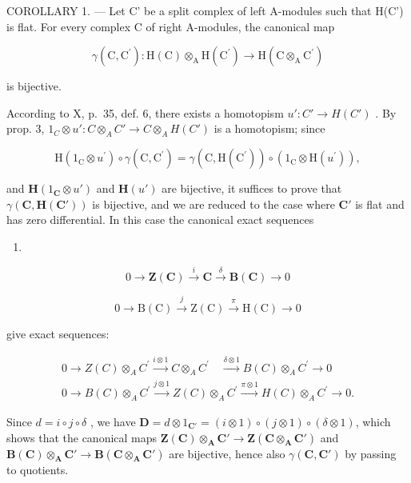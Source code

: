 COROLLARY 1. --- Let C' be a split complex of left A-modules such that H(C') is flat. For every complex C of right A-modules, the canonical map

\[
\gamma (\mathrm{C}, \mathrm{C} ^ {\prime}): \mathrm{H} (\mathrm{C}) \otimes_ {\mathrm{A}} \mathrm{H} (\mathrm{C} ^ {\prime}) \rightarrow \mathrm{H} (\mathrm{C} \otimes_ {\mathrm{A}} \mathrm{C} ^ {\prime})
\]

is bijective.

According to X, p.~35, def. 6, there exists a homotopism \(u': C' \to H(C')\) . By prop. 3, \(1_{C} \otimes u': C \otimes_{A} C' \to C \otimes_{A} H(C')\) is a homotopism; since

\[
\mathrm{H} \left(1 _ {\mathrm{C}} \otimes u ^ {\prime}\right) \circ \gamma (\mathrm{C}, \mathrm{C} ^ {\prime}) = \gamma (\mathrm{C}, \mathrm{H} (\mathrm{C} ^ {\prime})) \circ \left(1 _ {\mathrm{C}} \otimes \mathrm{H} (u ^ {\prime})\right),
\]

and \(\mathbf{H}(1_{\mathbf{C}} \otimes u')\) and \(\mathbf{H}(u')\) are bijective, it suffices to prove that \(\gamma(\mathbf{C}, \mathbf{H}(\mathbf{C}'))\) is bijective, and we are reduced to the case where \(\mathbf{C}'\) is flat and has zero differential. In this case the canonical exact sequences

\begin{enumerate}
\def\labelenumi{(\Roman{enumi})}
\tightlist
\item
\end{enumerate}

\[
0 \to \mathbf {Z} (\mathbf {C}) \xrightarrow {i} \mathbf {C} \xrightarrow {\delta} \mathbf {B} (\mathbf {C}) \to 0\tag{II}
\]

\[
0 \rightarrow \mathrm{B} (\mathrm{C}) \xrightarrow {j} \mathrm{Z} (\mathrm{C}) \xrightarrow {\pi} \mathrm{H} (\mathrm{C}) \rightarrow 0
\]

give exact sequences:

\[
\begin{array}{l} 0 \longrightarrow Z (C) \otimes_ {A} C ^ {\prime} \xrightarrow {i \otimes 1} C \otimes_ {A} C ^ {\prime} \quad \xrightarrow {\delta \otimes 1} B (C) \otimes_ {A} C ^ {\prime} \longrightarrow 0 \\ 0 \longrightarrow B (C) \otimes_ {A} C ^ {\prime} \xrightarrow {j \otimes 1} Z (C) \otimes_ {A} C ^ {\prime} \xrightarrow {\pi \otimes 1} H (C) \otimes_ {A} C ^ {\prime} \longrightarrow 0. \end{array}
\]

Since \(d = i \circ j \circ \delta\) , we have \(\mathbf{D} = d \otimes 1_{\mathbf{C}'} = (i \otimes 1) \circ (j \otimes 1) \circ (\delta \otimes 1)\), which shows that the canonical maps \(\mathbf{Z}(\mathbf{C}) \otimes_{\mathbf{A}} \mathbf{C}' \to \mathbf{Z}(\mathbf{C} \otimes_{\mathbf{A}} \mathbf{C}')\) and \(\mathbf{B}(\mathbf{C}) \otimes_{\mathbf{A}} \mathbf{C}' \to \mathbf{B}(\mathbf{C} \otimes_{\mathbf{A}} \mathbf{C}')\) are bijective, hence also \(\gamma(\mathbf{C}, \mathbf{C}')\) by passing to quotients.

